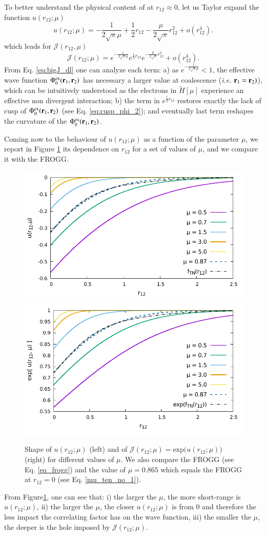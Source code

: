 \documentclass[aip,jcp,reprint,noshowkeys,superscriptaddress]{revtex4-1}
\newcommand{\br}[0]{{\bf {r}}}
\newcommand{\phiex}[0]{\Phi^{\text{ex}}_0}
\begin{document}
To better understand the physical content of at $r_{12}\approx 0$,  
let us Taylor expand the function $u(r_{12};\mu)$ 
\begin{equation}
 \label{eq:j_dl}
 u(r_{12};\mu) = -\frac{1}{2\sqrt{\pi}\mu} + \frac{1}{2}r_{12} - \frac{\mu}{2\sqrt{\pi}} r_{12}^2 + o(r_{12}^4).
\end{equation}
which leads for $\mathcal{J}(r_{12},\mu)$
\begin{equation}
 \label{eq:bigJ_dl}
 \mathcal{J}(r_{12};\mu) = e^{-\frac{1}{2\sqrt{\pi}\mu}} e^{ \frac{1}{2}r_{12}} e^{- \frac{\mu}{2\sqrt{\pi}} r_{12}^2} + o(r_{12}^4) .
\end{equation}
From Eq. \eqref{eq:bigJ_dl} one can analyze each term: a) as $e^{-\frac{1}{2\sqrt{\pi}\mu}}<1$, the effective wave function  $\phiex(\br{}_1,\br{}_2)$ has necessary a larger value at coalescence (\textit{i.e.} $\br{}_1=\br{}_2)$), which can be intuitively understood as the electrons in $\tilde{H}[\mu]$ experience an effective non divergent interaction; 
b) the term in $e^{ \frac{1}{2}r_{12}} $ restores exactly the lack of cusp of $\phiex(\br{}_1,\br{}_2)$ (see Eq. \eqref{eq:cusp_phi_2}); and eventually last term reshapes the curvature of the $\phiex(\br{}_1,\br{}_2)$. 

Coming now to the behaviour of $u(r_{12};\mu)$ as a function of the parameter $\mu$, we report in Figure \ref{fig_j_mu} its dependence on $r_{12}$ for a set of values of $\mu$, and we compare it with the FROGG. 
\begin{figure}
 \label{fig_j_mu}
        \includegraphics[width=0.45\linewidth]{plots/jastrow/small_mu_j.pdf}
        \includegraphics[width=0.45\linewidth]{plots/jastrow/small_mu_exp_j.pdf}\\
        \caption{Shape of $u(r_{12};\mu)$ (left) and of $\mathcal{J}(r_{12};\mu) = \text{exp}\bigg(u(r_{12};\mu) \bigg) $ (right) for different values of $\mu$. 
We also compare the FROGG (see Eq. \eqref{eq_frogg}) and the value of $\mu = 0.865$ which equals the FROGG at $r_{12}=0$ (see Eq. \eqref{mu_ten_no_1}). }
\end{figure}
From Figure\ref{fig_j_mu}, one can see that: i) the larger the $\mu$, the more short-range is $u(r_{12};\mu)$, ii) the larger the $\mu$, the closer $u(r_{12};\mu)$ is from 0 and therefore the less impact the correlating factor has on the wave function, iii) the smaller the $\mu$, the deeper is the hole imposed by $\mathcal{J}(r_{12};\mu)$. 
\end{document}
